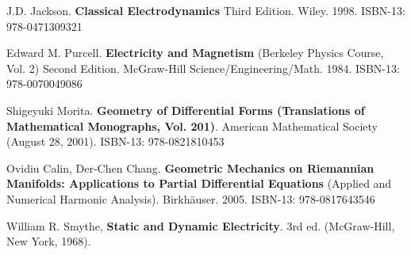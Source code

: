 \documentclass[10pt]{amsart}
\begin{document}
\begin{thebibliography}{9}

J.D. Jackson.  \textbf{Classical Electrodynamics} Third Edition.  Wiley.  1998.   ISBN-13: 978-0471309321

Edward M. Purcell.  \textbf{Electricity and Magnetism} (Berkeley Physics Course, Vol. 2) Second Edition.  McGraw-Hill Science/Engineering/Math.  1984.  ISBN-13: 978-0070049086

Shigeyuki Morita.  \textbf{Geometry of Differential Forms (Translations of Mathematical Monographs, Vol. 201)}.  American Mathematical Society (August 28, 2001).   ISBN-13: 978-0821810453

Ovidiu Calin, Der-Chen Chang. \textbf{Geometric Mechanics on Riemannian Manifolds: Applications to Partial Differential Equations} (Applied and Numerical Harmonic Analysis).  Birkh\"{a}user. 2005. ISBN-13: 978-0817643546

William R. Smythe, \textbf{Static and Dynamic Electricity}.  3rd ed. (McGraw-Hill, New York, 1968).  

  \end{thebibliography}
\end{document}
